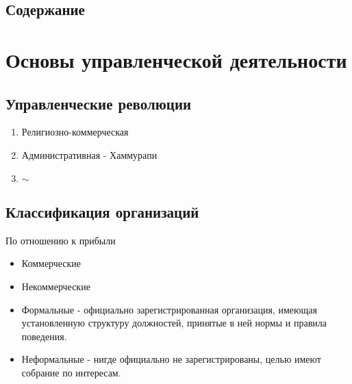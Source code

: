 \documentclass[a4paper,12pt]{report}
\begin{document}
	\sloppy

	\def \LineB {Конспект по дисциплине}
	\def \LineC {“Основы современного управления”}
	\def \LineD {\vspace{2cm}}
	\def \nocredits {}

\maketitle

\subsection*{Содержание}
\maketoc






\section{Основы управленческой деятельности}


\subsection{Управленческие революции}

	\begin{enumerate}
		\item	Религиозно-коммерческая
		\item	Административная - Хаммурапи
		\item	$\sim$
	\end{enumerate}



\subsection{Классификация организаций}

	По отношению к прибыли
	\begin{itemize}
		\item	Коммерческие
		\item	Некоммерческие
	\end{itemize}

	\begin{itemize}
		\item	Формальные - официально зарегистрированная организация, имеющая установленную структуру должностей, принятые в ней нормы и правила поведения.
		\item	Неформальные - нигде официально не зарегистрированы, целью имеют собрание по интересам.
	\end{itemize}
\end{document}
